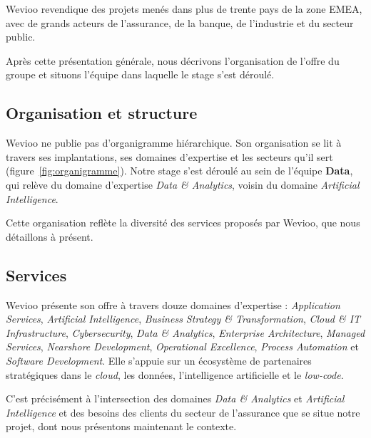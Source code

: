 Wevioo revendique des projets menés dans plus de trente pays de la zone EMEA, avec de grands acteurs de l'assurance, de la banque, de l'industrie et du secteur public.


Après cette présentation générale, nous décrivons l'organisation de l'offre du groupe et situons l'équipe dans laquelle le stage s'est déroulé.

\subsection{Organisation et structure}

Wevioo ne publie pas d'organigramme hiérarchique. Son organisation se lit à travers ses implantations, ses domaines d'expertise et les secteurs qu'il sert (figure~\ref{fig:organigramme}). Notre stage s'est déroulé au sein de l'équipe \textbf{Data}, qui relève du domaine d'expertise \textit{Data \& Analytics}, voisin du domaine \textit{Artificial Intelligence}.


Cette organisation reflète la diversité des services proposés par Wevioo, que nous détaillons à présent.

\subsection{Services}

Wevioo présente son offre à travers douze domaines d'expertise : \textit{Application Services}, \textit{Artificial Intelligence}, \textit{Business Strategy \& Transformation}, \textit{Cloud \& IT Infrastructure}, \textit{Cybersecurity}, \textit{Data \& Analytics}, \textit{Enterprise Architecture}, \textit{Managed Services}, \textit{Nearshore Development}, \textit{Operational Excellence}, \textit{Process Automation} et \textit{Software Development}. Elle s'appuie sur un écosystème de partenaires stratégiques dans le \textit{cloud}, les données, l'intelligence artificielle et le \textit{low-code}.

C'est précisément à l'intersection des domaines \textit{Data \& Analytics} et \textit{Artificial Intelligence} et des besoins des clients du secteur de l'assurance que se situe notre projet, dont nous présentons maintenant le contexte.

